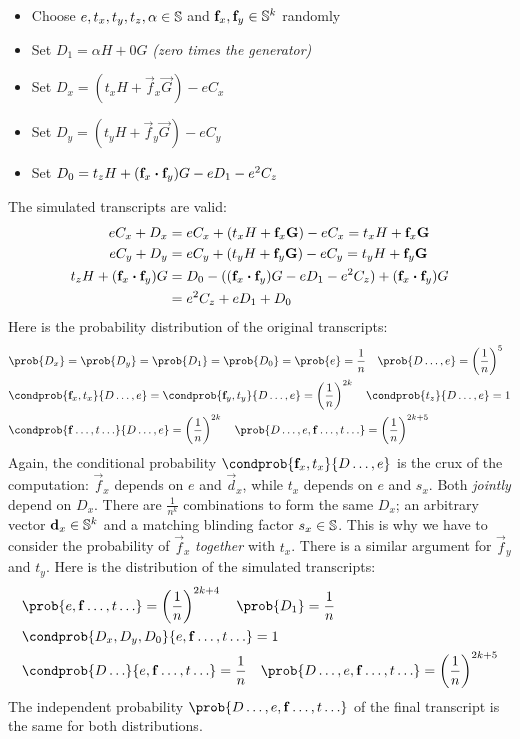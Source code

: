 \begin{itemize}
    \item Choose $e, t_x, t_y, t_z, \alpha \in \mathbb{S}$ and $\mathbf{f}_x, \mathbf{f}_y \in \mathbb{S}^k$ randomly
    \item Set $D_1 = \alpha H + 0G$ \emph{(zero times the generator)}
    \item Set $D_x = (t_xH + \vec{f}_x\vec{G}) - eC_x$
    \item Set $D_y = (t_yH + \vec{f}_y\vec{G}) - eC_y$
    \item Set $D_0 = t_zH + (\mathbf{f}_x \boldsymbol{\cdot} \mathbf{f}_y)G - eD_1 - e^2 C_z$
\end{itemize}
%
The simulated transcripts are valid:
%
\begin{align*}
    eC_x + D_x &= eC_x + (t_xH + \mathbf{f}_x\mathbf{G}) - eC_x = t_xH + \mathbf{f}_x\mathbf{G} \\
    eC_y + D_y &= eC_y + (t_yH + \mathbf{f}_y\mathbf{G}) - eC_y = t_yH + \mathbf{f}_y\mathbf{G} \\
    t_zH + (\mathbf{f}_x \boldsymbol{\cdot} \mathbf{f}_y)G &= D_0 - ((\mathbf{f}_x \boldsymbol{\cdot} \mathbf{f}_y)G - eD_1 - e^2C_z) + (\mathbf{f}_x \boldsymbol{\cdot} \mathbf{f}_y)G \\
    &= e^2 C_z + eD_1 + D_0
\end{align*}
%
Here is the probability distribution of the original transcripts:
%
\begin{align*}
    &\prob{D_x} = \prob{D_y} = \prob{D_1} = \prob{D_0} = \prob{e} = \frac{1}{n} \quad \prob{D\ldots, e} = \left( \frac{1}{n} \right)^5 \\
    &\condprob{\vec{f}_x, t_x}{D\ldots, e} = \condprob{\vec{f}_y, t_y}{D\ldots, e} = \left( \frac{1}{n} \right)^{2k} \quad \condprob{t_z}{D\ldots, e} = 1 \\
    &\condprob{\vec{f}\ldots, t\ldots}{D\ldots, e} = \left( \frac{1}{n} \right)^{2k} \quad \prob{D\ldots, e, \vec{f}\ldots, t\ldots} = \left( \frac{1}{n} \right)^{2k + 5}
\end{align*}
%
Again,
the conditional probability $\condprob{\vec{f}_x, t_x}{D\ldots, e}$ is the crux of the computation:
$\vec{f}_x$ depends on $e$ and $\vec{d}_x$, while $t_x$ depends on $e$ and $s_x$.
Both \emph{jointly} depend on $D_x$.
There are $\frac{1}{n^k}$ combinations to form the same $D_x$;
an arbitrary vector $\mathbf{d}_x \in \mathbb{S}^k$ and a matching blinding factor $s_x \in \mathbb{S}$.
This is why we have to consider the probability of $\vec{f}_x$ \emph{together} with $t_x$.
%
There is a similar argument for $\vec{f}_y$ and $t_y$.
%
Here is the distribution of the simulated transcripts:
\begin{align*}
    &\prob{e, \vec{f}\ldots, t\ldots} = \left( \frac{1}{n} \right)^{2k + 4} \quad \prob{D_1} = \frac{1}{n} \\
    &\condprob{D_x, D_y, D_0}{e, \vec{f}\ldots, t\ldots} = 1 \\
    &\condprob{D\ldots}{e, \vec{f}\ldots, t\ldots} = \frac{1}{n} \quad \prob{D\ldots, e, \vec{f}\ldots, t\ldots} = \left( \frac{1}{n} \right)^{2k + 5}
\end{align*}
%
The independent probability $\prob{D\ldots, e, \vec{f}\ldots, t\ldots}$ of the final transcript is the same for both distributions.


